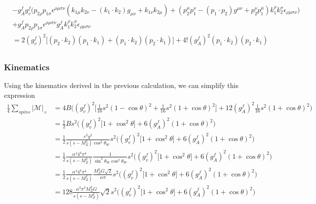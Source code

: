 \documentclass[11pt]{article}
\begin{document}
\begin{flushleft}
\begin{align*}
&- g_A^f g_v^f \Big( p_{2 \rho} p_{1 \sigma}\epsilon^{\rho \mu \sigma \nu}
(k_{1 \mu} k_{2 \nu} - (k_1 \cdot k_2)g_{\mu \nu} + k_{1 \nu} k_{2 \mu}) +(p_2^{\mu} p_1^{\nu} - (p_1 \cdot p_2)g^{\mu \nu} + p_2^{\nu} p_1^{\mu})
k_1^{\rho} k_2^{\sigma} \epsilon_{\rho \mu \sigma \nu} \Big) \\
&+ g_A^f p_{2 \rho} p_{1 \sigma}\epsilon^{\rho \mu \sigma \nu}g_A^f k_1^{\rho} k_2^{\sigma} \epsilon_{\rho \mu \sigma \nu} \\
&= 2 (g_v^f)^2\Big[(p_2 \cdot k_2) (p_1 \cdot k_1)  + (p_1 \cdot k_2) (p_2 \cdot k_1) \Big] 
+ 4! (g_A^f)^2 (p_1 \cdot k_2)(p_2 \cdot k_1) \\
\end{align*}
\end{flushleft}

\subsubsection*{Kinematics}
\begin{flushleft}
Using the kinematics derived in the previous calculation, we can simplify this expression
\begin{align*}
\frac{1}{4} \sum_{spins} |\mathcal{M}|_{\times} &= 4 B \Big((g_v^f)^2\Big[\frac{1}{16}s^2(1- \cos \theta)^2  + \frac{1}{16}s^2(1+ \cos \theta)^2 \Big] 
+ 12 (g_A^f)^2 \frac{1}{16}s^2(1+ \cos \theta)^2 \Big)\\
&= \frac{1}{2} B s^2 \Big((g_v^f)^2 \Big[1+ \cos^2 \theta\Big] 
+ 6 (g_A^f)^2 (1+ \cos \theta)^2 \Big)\\
&= \frac{1}{2} \frac{e^2 g^2}{s(s - M_Z^2)\cos^2 \theta_W} s^2 \Big((g_v^f)^2 \Big[1+ \cos^2 \theta\Big] 
+ 6 (g_A^f)^2 (1+ \cos \theta)^2 \Big)\\
&= \frac{1}{2} \frac{\alpha^4 4^4 \pi^4}{s(s - M_Z^2)} 
\frac{1}{\sin^2 \theta_W \cos^2 \theta_W}
s^2 \Big((g_v^f)^2 \Big[1+ \cos^2 \theta\Big] 
+ 6 (g_A^f)^2 (1+ \cos \theta)^2 \Big)\\
&= \frac{1}{2} \frac{\alpha^4 4^4 \pi^4}{s(s - M_Z^2)} 
\frac{M_Z^2 G \sqrt{2}}{\alpha \pi}
s^2 \Big((g_v^f)^2 \Big[1+ \cos^2 \theta\Big] 
+ 6 (g_A^f)^2 (1+ \cos \theta)^2 \Big)\\
&= 128 \frac{\alpha^3 \pi^3M_Z^2 G}{s(s - M_Z^2)} 
 \sqrt{2}
s^2 \Big((g_v^f)^2 \Big[1+ \cos^2 \theta\Big] 
+ 6 (g_A^f)^2 (1+ \cos \theta)^2 \Big)\\
\end{align*}
\end{flushleft}

\pagebreak
\end{document}
